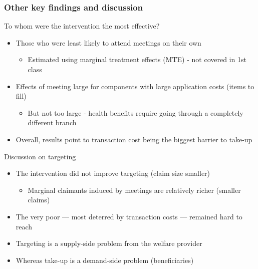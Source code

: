 \documentclass[aspectratio=169]{beamer}
\begin{document}
\begin{frame}
  \frametitle{Other key findings and discussion}
  To whom were the intervention the most effective?
  \begin{itemize}\setlength\itemsep{3pt}
    \item Those who were least likely to attend meetings on their own
    \begin{itemize}
      \item Estimated using marginal treatment effects (MTE) - not covered in 1st class
  \end{itemize}
  \item Effects of meeting large for components with large application costs (items to fill)
    \begin{itemize}
      \item But not too large - health benefits require going through a completely different branch
  \end{itemize}
  \item Overall, results point to transaction cost being the biggest barrier to take-up
    \end{itemize}\medskip
  Discussion on targeting
   \begin{itemize}\setlength\itemsep{3pt}
     \item The intervention did not improve targeting (claim size smaller)
     \begin{itemize}
  \item Marginal claimants induced by meetings are relatively richer (smaller claims)
\end{itemize}
\item The very poor --- most deterred by transaction costs --- remained hard to reach
     \item Targeting is a supply-side problem from the welfare provider
     \item Whereas take-up is a demand-side problem (beneficiaries)
     \end{itemize}
\end{frame}
\end{document}
